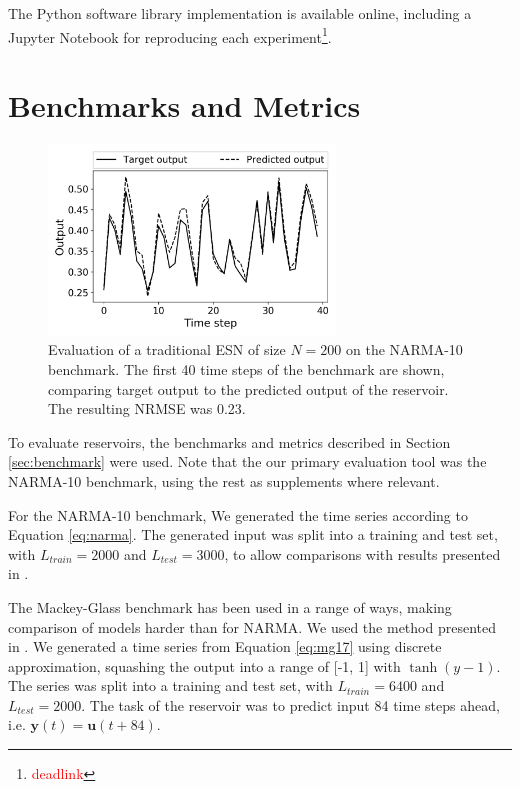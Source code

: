 The Python software library implementation is available online, including a
Jupyter Notebook for reproducing each
experiment\footnote{\textcolor{red}{deadlink}}.

\section{Benchmarks and Metrics}
\label{sec:bench-metr}

\begin{figure}[t!]
  \centering
  \includegraphics[width=3.0in]{figures/benchmark-example.png}
  \caption{
    Evaluation of a traditional ESN of size $N = 200$ on the NARMA-10
benchmark. The first 40 time steps of the benchmark are shown, comparing target
output to the predicted output of the reservoir. The resulting NRMSE was 0.23.
  }
  \label{fig:benchmark-example}
\end{figure}

To evaluate reservoirs, the benchmarks and metrics described in Section
\ref{sec:benchmark} were used. Note that the our primary evaluation tool was the
NARMA-10 benchmark, using the rest as supplements where relevant.

For the NARMA-10 benchmark, We generated the time series according to Equation
\ref{eq:narma}. The generated input was split into a training and test set, with
$L_{train} = 2000$ and $L_{test} = 3000$, to allow comparisons with results
presented in \cite{rodan_minimum_2011}.

The Mackey-Glass benchmark has been used in a range of ways, making comparison
of models harder than for NARMA. We used the method presented in
\cite{ma_deep-esn:_2017}. We generated a time series from Equation \ref{eq:mg17}
using discrete approximation, squashing the output into a range of [-1, 1] with
$\tanh(y-1)$. The series was split into a training and test set, with $L_{train}
= 6400$ and $L_{test} = 2000$. The task of the reservoir was to predict input 84
time steps ahead, i.e. $\mathbf{y}(t) = \mathbf{u}(t+84)$.


